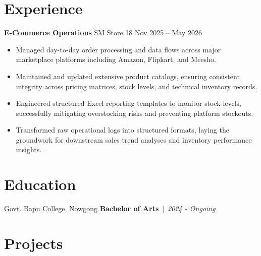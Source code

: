 \documentclass[11pt,letterpaper]{article}
\begin{document}
\section{Experience}
\noindent
\textbf{E-Commerce Operations} \textbar{} SM Store 18 \hfill Nov 2025 – May 2026 
\begin{itemize}
    \item Managed day-to-day order processing and data flows across major marketplace platforms including Amazon, Flipkart, and Meesho.
    \item Maintained and updated extensive product catalogs, ensuring consistent integrity across pricing matrices, stock levels, and technical inventory records.
    \item Engineered structured Excel reporting templates to monitor stock levels, successfully mitigating overstocking risks and preventing platform stockouts.
    \item Transformed raw operational logs into structured formats, laying the groundwork for downstream sales trend analyses and inventory performance insights.
\end{itemize}

\section{Education}
\noindent
Govt. Bapu College, Nowgong \hfill \textbf{} {\bfseries Bachelor of Arts} \hfill  \,|\, \textit{2024 - Ongoing}

\section{Projects}
\end{document}
